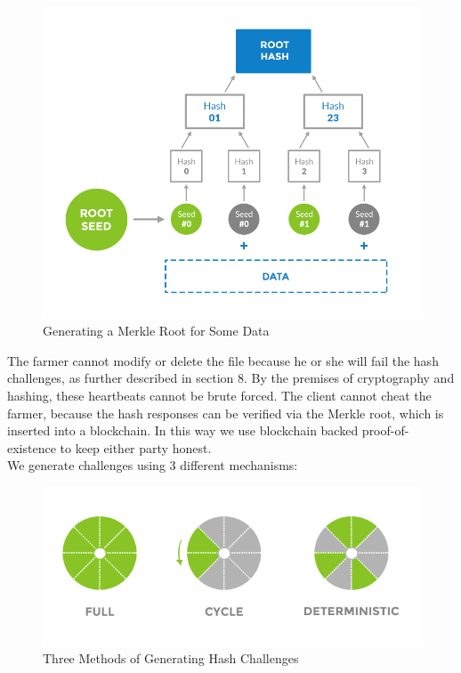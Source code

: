 \documentclass[a4paper,10pt]{article}
\begin{document}
\begin{figure}[hbt]
\centering
\includegraphics[width=\linewidth]{3}
\caption{Generating a Merkle Root for Some Data}
\end{figure}

The farmer cannot modify or delete the file because he or she will fail the hash challenges, as further described in section 8. By the premises of cryptography and hashing, these heartbeats cannot be brute forced. The client cannot cheat the farmer, because the hash responses can be verified via the Merkle root, which is inserted into a blockchain. In this way we use blockchain backed proof-of-existence \cite{4} \cite{5} to keep either party honest.\\

We generate challenges using 3 different mechanisms: \\

\begin{figure}[hbt]
\centering
\includegraphics[width=\linewidth]{4}
\caption{Three Methods of Generating Hash Challenges}
\end{figure}
\end{document}
